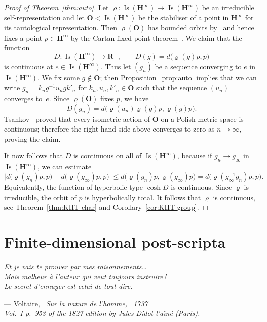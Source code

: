 \documentclass[11pt]{article}
\theoremstyle{definition}
\numberwithin{equation}{section}
\numberwithin{figure}{section}
\numberwithin{table}{section}
\newcommand{\RR}{\mathbf{R}}
\newcommand{\HHI}{\mathbf{H}^{\infty}}
\newcommand{\OO}{{\mathbf O}}
\newcommand{\Isomi}{{\Isom}(\HHI)}
\DeclareMathOperator{\Isom}{Is}
\newcommand{\inv}{^{-1}}
\newcommand{\ro}{\varrho}
\begin{document}
\begin{proof}[Proof of Theorem~\ref{thm:auto}]
Let $\ro\colon\Isomi\to\Isomi$ be an irreducible self-rep\-re\-sen\-ta\-tion and let $\OO<\Isomi$ be the stabiliser of a point in $\HHI$ for its tautological representation. Then $\ro(\OO)$ has bounded orbits by~\cite[p.~190]{Ricard-Rosendal} and hence fixes a point $p\in\HHI$ by the Cartan fixed-point theorem~\cite[II.2.8]{Bridson-Haefliger}. We claim that the function
\[
D\colon \Isomi \longrightarrow \RR_+, \qquad D(g) = d\big(\ro(g) p, p\big)
\]
is continuous at $e\in\Isomi$. Thus let $(g_n)$ be a sequence converging to $e$ in $\Isomi$. We fix some $g\notin\OO$; then Proposition~\ref{prop:auto} implies that we can write $g_n = k_n g\inv u_n g k'_n$ for $k_n, u_n, k'_n\in\OO$ such that the sequence $(u_n)$ converges to~$e$. Since $\ro(\OO)$ fixes $p$, we have
\[
D(g_n) = d\big(\ro(u_n)\ro(g)p, \ro(g)p\big).
\]
Tsankov~\cite{Tsankov13} proved that every isometric action of $\OO$ on a Polish metric space is continuous; therefore the right-hand side above converges to zero as $n\to\infty$, proving the claim.

It now follows that $D$ is continuous on all of $\Isomi$, because if $g_n\to g_\infty$ in $\Isomi$, we can estimate
\[
\Big| d\big(\ro(g_n) p, p\big) - d\big(\ro(g_\infty) p, p\big) \Big| \leq d\big(\ro(g_n) p, \ro(g_\infty) p\big) = d\big(\ro(g_\infty\inv g_n) p, p\big).
\]
Equivalently, the function of hyperbolic type $\cosh D$ is continuous. Since $\ro$ is irreducible, the orbit of $p$ is hyperbolically total. It follows that $\ro$ is continuous, see Theorem~\ref{thm:KHT-char} and Corollary~\ref{cor:KHT-group}.
\end{proof}

\section{Finite-dimensional post-scripta}\label{sec:PS}

\begin{flushright}
\begin{minipage}[t]{\linewidth}\itshape\small
Et je vais te prouver par mes raisonnements\ldots\\
Mais malheur \`a l'auteur qui veut toujours instruire\,!\\
Le secret d'ennuyer est celui de tout dire.
\begin{flushright}
\upshape\small --- Voltaire, \itshape\ Sur la nature de l'homme, \upshape\ 1737\\ Vol.~I p.~953 of the 1827 edition by Jules Didot l'a\^{\i}n\'e (Paris).
\end{flushright}
\end{minipage}
\end{flushright}
\bigskip
\end{document}
